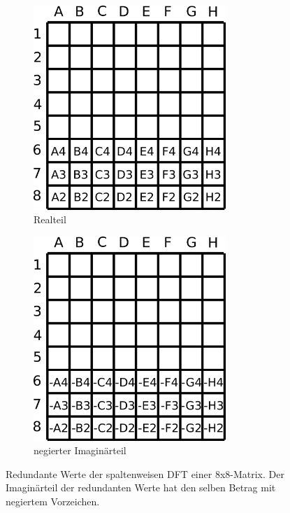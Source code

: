 \begin{figure}[htbp]
 \centering
  \begin{subfigure}{.5\textwidth}
  \centering
   \includegraphics[width=0.8\textwidth]{img/reelleMatMultRedundanzRealteil.png}
   \caption{Realteil}
  \end{subfigure}%
  \begin{subfigure}{.5\textwidth} 
   \centering
   \includegraphics[width=0.8\textwidth]{img/reelleMatMultRedundanzImagteil.png}
   \caption{negierter Imaginärteil}
  \end{subfigure}
  \caption{Redundante Werte der spaltenweisen DFT einer 8x8-Matrix. Der Imaginärteil der redundanten Werte hat den selben Betrag mit negiertem Vorzeichen.}
 \label{pic:reelleMatMultRedundanz}
\end{figure}




